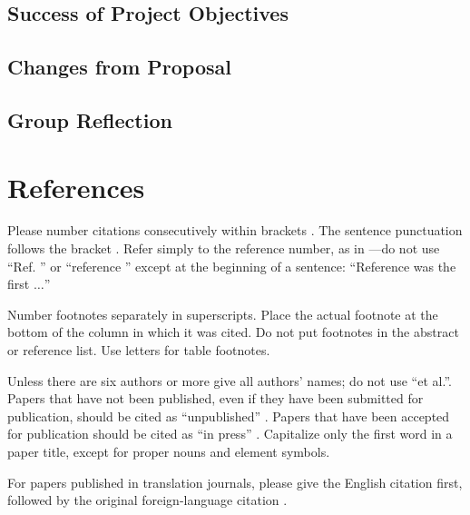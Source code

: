 \documentclass[titlepage]{article}
\begin{document}
\subsection{Success of Project Objectives}

\subsection{Changes from Proposal}

\subsection{Group Reflection}

\section*{References}

Please number citations consecutively within brackets \cite{b1}. The
sentence punctuation follows the bracket \cite{b2}. Refer simply to the reference
number, as in \cite{b3}---do not use ``Ref. \cite{b3}'' or ``reference \cite{b3}'' except at
the beginning of a sentence: ``Reference \cite{b3} was the first $\ldots$''

Number footnotes separately in superscripts. Place the actual footnote at
the bottom of the column in which it was cited. Do not put footnotes in the
abstract or reference list. Use letters for table footnotes.

Unless there are six authors or more give all authors' names; do not use
``et al.''. Papers that have not been published, even if they have been
submitted for publication, should be cited as ``unpublished'' \cite{b4}. Papers
that have been accepted for publication should be cited as ``in press'' \cite{b5}.
Capitalize only the first word in a paper title, except for proper nouns and
element symbols.

For papers published in translation journals, please give the English
citation first, followed by the original foreign-language citation \cite{b6}.
\end{document}
